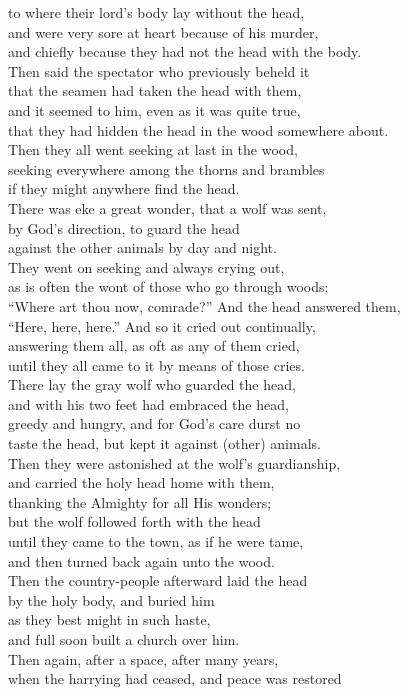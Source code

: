 \documentclass[10pt]{book}
\begin{document}
\begin{center}
\parbox{\pagelen}{
to where their lord's body lay without the head, \\ 
and were very sore at heart because of his murder, \\
and chiefly because they had not the head with the body. \\
Then said the spectator who previously beheld it \\
that the seamen had taken the head with them, \\
and it seemed to him, even as it was quite true, \\
that they had hidden the head in the wood somewhere about. \\
Then they all went seeking at last in the wood, \\
seeking everywhere among the thorns and brambles \\
if they might anywhere find the head. \\
There was eke a great wonder, that a wolf was sent, \\
by God's direction, to guard the head \\
against the other animals by day and night. \\
They went on seeking and always crying out, \\
as is often the wont of those who go through woods; \\
``Where art thou now, comrade?'' And the head answered them, \\
``Here, here, here.'' And so it cried out continually, \\
answering them all, as oft as any of them cried,  \\
until they all came to it by means of those cries. \\
There lay the gray wolf who guarded the head, \\
and with his two feet had embraced the head, \\
greedy and hungry, and for God's care durst no \\
taste the head, but kept it against (other) animals. \\
Then they were astonished at the wolf's guardianship, \\
and carried the holy head home with them, \\
thanking the Almighty for all His wonders; \\
but the wolf followed forth with the head \\
until they came to the town, as if he were tame, \\
and then turned back again unto the wood. \\
Then the country-people afterward laid the head \\
by the holy body, and buried him \\
as they best might in such haste, \\
and full soon built a church over him. \\
Then again, after a space, after many years, \\
when the harrying had ceased, and peace was restored \\
}
\end{center}
\end{document}
